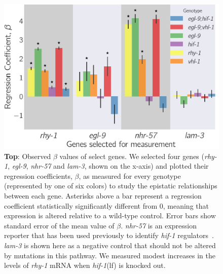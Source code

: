 \documentclass[9pt,twocolumn,twoside]{pnas-new}
\newcommand{\gene}[1]{\emph{#1}}
\newcommand{\nhr}{\emph{\mbox{nhr-57}}}
\newcommand{\lam}{\emph{\mbox{lam-3}}}
\newcommand{\hif}{\emph{\mbox{hif-1}}(lf)}
\begin{document}
\begin{figure}[tbhp]
\centering
\includegraphics[width=\linewidth]{figs/qpcr.pdf}
\caption{
\textbf{Top}: Observed $\beta$ values of select genes. We selected
four genes (\gene{rhy-1}, \gene{egl-9}, \nhr{} and \lam{}, shown on the x-axis)
and plotted their regression coefficients, $\beta$, as measured for every
genotype (represented by one of six colors) to study the epistatic relationships
between each gene. Asterisks above a bar represent a regression coefficient
statistically significantly different from 0, meaning that expression is altered
relative to a wild-type control. Error bars show standard error of the mean
value of $\beta$. \nhr{} is an expression reporter that has been used previously
to identify \gene{hif-1} regulators~\cite{Shen2006,Shao2009}. \lam{} is shown here
as a negative control that should not be altered by mutations in this pathway.
We measured modest increases in the levels of \gene{rhy-1} mRNA when \hif{} is
knocked out.
}
\label{fig:qpcr}
\end{figure}
\end{document}
